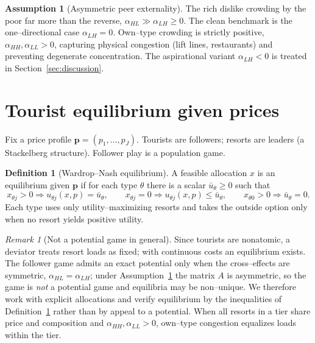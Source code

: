 \documentclass[11pt]{article}
\theoremstyle{plain}
\theoremstyle{definition}
\newtheorem{assumption}{Assumption}
\newtheorem{definition}{Definition}
\theoremstyle{remark}
\newtheorem{remark}{Remark}
\newcommand{\aHH}{\alpha_{HH}}
\newcommand{\aHL}{\alpha_{HL}}
\newcommand{\aLH}{\alpha_{LH}}
\newcommand{\aLL}{\alpha_{LL}}
\begin{document}
\begin{assumption}[Asymmetric peer externality]\label{ass:asym}
The rich dislike crowding by the poor far more than the reverse, $\aHL \gg \aLH \ge 0$. The
clean benchmark is the one--directional case $\aLH=0$. Own--type crowding is strictly positive,
$\aHH,\aLL>0$, capturing physical congestion (lift lines, restaurants) and preventing
degenerate concentration. The aspirational variant $\aLH<0$ is treated in
Section~\ref{sec:discussion}.
\end{assumption}

\section{Tourist equilibrium given prices}

Fix a price profile $\bm{p}=(p_1,\dots,p_J)$. Tourists are followers; resorts are leaders (a
Stackelberg structure). Follower play is a population game.

\begin{definition}[Wardrop--Nash equilibrium]\label{def:eq}
A feasible allocation $x$ is an equilibrium given $\bm p$ if for each type $\theta$ there is a
scalar $\bar u_\theta\ge 0$ such that
\[
x_{\theta j}>0 \Rightarrow u_{\theta j}(x,p)=\bar u_\theta,
\qquad
x_{\theta j}=0 \Rightarrow u_{\theta j}(x,p)\le \bar u_\theta,
\qquad
x_{\theta 0}>0 \Rightarrow \bar u_\theta=0.
\]
Each type uses only utility--maximizing resorts and takes the outside option only when no
resort yields positive utility.
\end{definition}

\begin{remark}[Not a potential game in general]\label{rem:nopotential}
Since tourists are nonatomic, a deviator treats resort loads as fixed; with continuous costs an
equilibrium exists. The follower game admits an exact potential only when the cross--effects are
symmetric, $\aHL=\aLH$; under Assumption~\ref{ass:asym} the matrix $A$ is asymmetric, so the
game is \emph{not} a potential game and equilibria may be non--unique. We therefore work with
explicit allocations and verify equilibrium by the inequalities of Definition~\ref{def:eq}
rather than by appeal to a potential. When all resorts in a tier share price and composition
and $\aHH,\aLL>0$, own--type congestion equalizes loads within the tier.
\end{remark}
\end{document}
